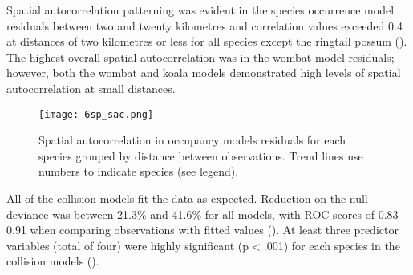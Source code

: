 Spatial autocorrelation patterning was evident in the species occurrence model residuals between two and twenty kilometres and correlation values exceeded 0.4 at distances of two kilometres or less for all species except the ringtail possum (). The highest overall spatial autocorrelation was in the wombat model residuals; however, both the wombat and koala models demonstrated high levels of spatial autocorrelation at small distances.

\begin{figure*}[htp]
  \centering
  \texttt{[image: 6sp\_sac.png]}
  \caption[Spatial autocorrelation in occupancy models residuals for six mammal species]{Spatial autocorrelation in occupancy models residuals for each species grouped by distance between observations. Trend lines use numbers to indicate species (see legend).}
  \label{6sp_sac}
\end{figure*}

All of the collision models fit the data as expected.  Reduction on the null deviance was between 21.3\% and 41.6\% for all models, with ROC scores of 0.83-0.91 when comparing observations with fitted values (). At least three predictor variables (total of four) were highly significant (p$<$.001) for each species in the collision models ().

